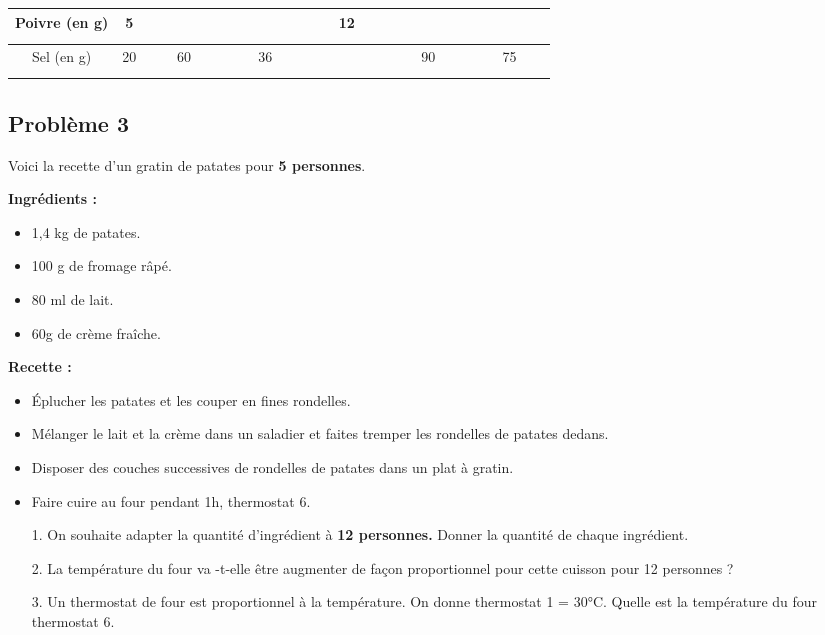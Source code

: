 \begin{center}\begin{tabular}{|c|c|c|c|c|c|c|} \hline
  Poivre (en g) &  5 &  $\phantom{\dfrac{azertyuiop}{O}}$  &   $\phantom{\dfrac{azertyuiop}{O}}$ & 12 &  $\phantom{\dfrac{azertyuiop}{O}}$  &  $\phantom{\dfrac{azertyuiop}{O}}$  \\  \hline
  Sel (en g)    & 20 & 60 & 36 &  $\phantom{\dfrac{azertyuiop}{O}}$  & 90 & 75 \\  \hline
\end{tabular}\end{center}

\Pointilles[5] 

\subsection*{Problème 3}

Voici la recette d'un gratin de patates pour \textbf{5 personnes}. 

\begin{minipage}[t]{0.45\textwidth}
  \textbf{Ingrédients : }
  \begin{itemize}
    \item 1,4 kg de patates.
    \item 100 g de fromage râpé.
    \item 80 ml de lait.
    \item 60g de crème fraîche.
  \end{itemize}

\end{minipage}
\begin{minipage}[t]{0.5\textwidth}
  \textbf{Recette :}
  \begin{itemize}
    \item Éplucher les patates et les couper en fines rondelles.
    \item Mélanger le lait et la crème dans un saladier et faites tremper les rondelles de patates dedans.
    \item Disposer des couches successives de rondelles de patates dans un plat à gratin. 
    \item Faire cuire au four pendant 1h, thermostat 6.
  \end{itemize}
\end{minipage}

\begin{enumerate}
  \item[1.] On souhaite adapter la quantité d'ingrédient à \textbf{12 personnes.} Donner la quantité de chaque ingrédient. \\ \Pointilles[7] 
  \item[2.] La température du four va -t-elle être augmenter de façon proportionnel pour cette cuisson pour 12 personnes ?  \\ \Pointilles[2] 
  \item[3.] Un thermostat de four est proportionnel à la température. On donne thermostat 1 = 30°C. Quelle est la température du four thermostat 6. \\ \Pointilles[3] 
\end{enumerate}



